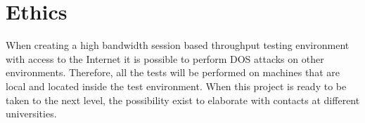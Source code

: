 \section{Ethics}
When creating a high bandwidth session based throughput testing environment with access to the Internet it is possible to perform DOS attacks on other environments. 
Therefore, all the tests will be performed on machines that are local and located inside the test environment. 
When this project is ready to be taken to the next level, the possibility exist to elaborate with contacts at different universities.  
